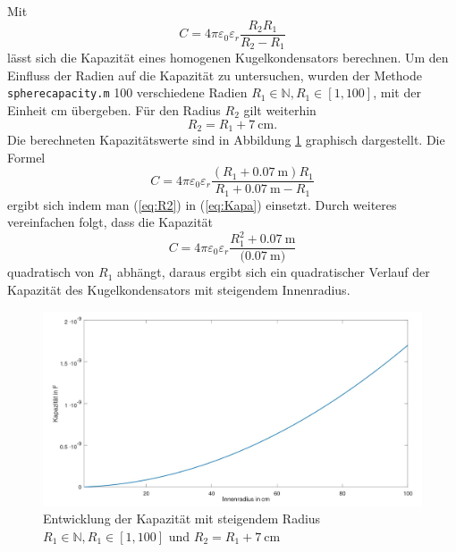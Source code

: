 Mit 
\begin{equation}
	C = 4\pi\varepsilon_0\varepsilon_r\frac{R_2R_1}{R_2-R_1}
	\label{eq:Kapa}	
\end{equation}
lässt sich die Kapazität eines homogenen Kugelkondensators berechnen.
Um den Einfluss der Radien auf die Kapazität zu untersuchen, wurden der Methode \texttt{spherecapacity.m} 100 verschiedene Radien $R_1 \in \mathbb{N}, R_1 \in [1,100]$, mit der Einheit \si{\centi\meter} übergeben. Für den Radius $R_2$ gilt weiterhin
\begin{equation}
	R_2 = R_1 + \SI{7}{\centi\meter}.
	\label{eq:R2}
\end{equation}
Die berechneten Kapazitätswerte sind in Abbildung \ref{fig:Kapa} graphisch dargestellt. Die Formel 
\begin{equation}
	C = 4\pi\varepsilon_0\varepsilon_r\frac{(R_1+\SI{0.07}{\meter})R_1}{R_1+\SI{0.07}{\meter-R_1}}
\end{equation}
ergibt sich indem man (\ref{eq:R2}) in (\ref{eq:Kapa}) einsetzt. Durch weiteres vereinfachen folgt, dass die Kapazität
\begin{equation}
	C = 4\pi\varepsilon_0\varepsilon_r\frac{R_1^2+\SI{0.07}{\meter}}{(\SI{0.07}{\meter)}}
\end{equation}
quadratisch von $R_1$ abhängt, daraus ergibt sich ein quadratischer Verlauf der Kapazität des Kugelkondensators mit steigendem Innenradius.

\begin{figure}
	\centering
	\includegraphics[width=\textwidth]{data/Kugelkapa}
	\caption{Entwicklung der Kapazität mit steigendem Radius $R_1 \in \mathbb{N}, R_1 \in [1,100]$ und $R_2 = R_1 + \SI{7}{\centi\meter}$}
	\label{fig:Kapa}
\end{figure}